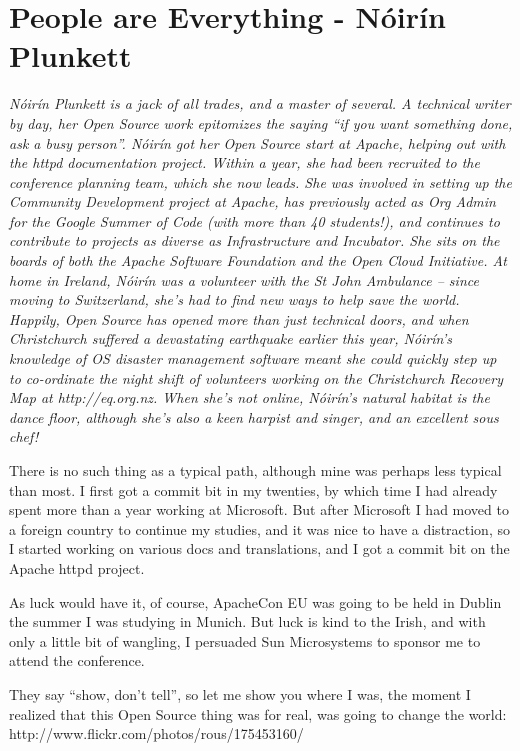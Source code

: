 \chapter{People are Everything - Nóirín Plunkett}

\textit{Nóirín Plunkett is a jack of all trades, and a master of several. A
technical writer by day, her Open Source work epitomizes the saying ``if you
want something done, ask a busy person''.
Nóirín got her Open Source start at Apache, helping out with the httpd
documentation project. Within a year, she had been recruited to the conference
planning team, which she now leads. She was involved in setting up the Community
Development project at Apache, has previously acted as Org Admin for the Google
Summer of Code (with more than 40 students!), and continues to contribute to
projects as diverse as Infrastructure and Incubator. She sits on the boards of
both the Apache Software Foundation and the Open Cloud Initiative.
At home in Ireland, Nóirín was a volunteer with the St John Ambulance -- since
moving to Switzerland, she’s had to find new ways to help save the world.
Happily, Open Source has opened more than just technical doors, and when
Christchurch suffered a devastating earthquake earlier this year, Nóirín’s
knowledge of OS disaster management software meant she could quickly step up to
co-ordinate the night shift of volunteers working on the Christchurch Recovery
Map at http://eq.org.nz.
When she’s not online, Nóirín’s natural habitat is the dance floor, although
she’s also a keen harpist and singer, and an excellent sous chef!}

There is no such thing as a typical path, although mine was perhaps
less typical than most. I first got a commit bit in my twenties, by
which time I had already spent more than a year working at Microsoft.
But after Microsoft I had moved to a foreign country to continue my
studies, and it was nice to have a distraction, so I started working
on various docs and translations, and I got a commit bit on the Apache
httpd project.

As luck would have it, of course, ApacheCon EU was going to be held in
Dublin the summer I was studying in Munich. But luck is kind to the
Irish, and with only a little bit of wangling, I persuaded Sun
Microsystems to sponsor me to attend the conference.

They say ``show, don't tell'', so let me show you where I was, the
moment I realized that this Open Source thing was for real, was going
to change the world:
http://www.flickr.com/photos/rous/175453160/ 

